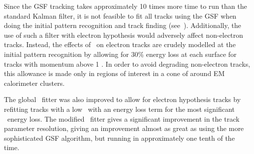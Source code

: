 Since the GSF tracking takes approximately 10 times more time to run than the
standard Kalman filter, it is not feasible to fit all tracks using the GSF when
doing the initial pattern recognition and track finding
(see~).  Additionally, the use of such a filter with electron
hypothesis would adversely affect non-electron tracks. Instead, the effects of
\brem\ on electron tracks are crudely modelled at the initial pattern
recognition by allowing for 30\% energy loss at each surface for tracks with
momentum above 1 \gev. In order to avoid degrading non-electron tracks, this
allowance is made only in regions of interest in a cone of  around
EM calorimeter clusters. 

The global \chisquared\ fitter was also improved to allow for electron
hypothesis tracks by refitting tracks with a low \chisquared\ with an energy
loss term for the most significant \brem\ energy loss.
The modified \chisquared\ fitter gives a significant improvement in the track
parameter resolution, giving an improvement almost as great as using the more
sophisticated GSF algorithm, but running in approximately one tenth of the time.

